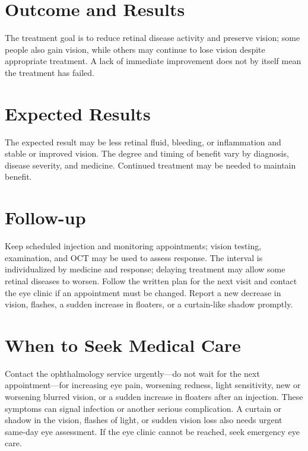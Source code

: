 \section*{Outcome and Results}
The treatment goal is to reduce retinal disease activity and preserve vision; some people also gain vision, while others may continue to lose vision despite appropriate treatment. A lack of immediate improvement does not by itself mean the treatment has failed.

\section*{Expected Results}
The expected result may be less retinal fluid, bleeding, or inflammation and stable or improved vision. The degree and timing of benefit vary by diagnosis, disease severity, and medicine. Continued treatment may be needed to maintain benefit.

\section*{Follow-up}
Keep scheduled injection and monitoring appointments; vision testing, examination, and OCT may be used to assess response. The interval is individualized by medicine and response; delaying treatment may allow some retinal diseases to worsen. Follow the written plan for the next visit and contact the eye clinic if an appointment must be changed. Report a new decrease in vision, flashes, a sudden increase in floaters, or a curtain-like shadow promptly.

\section*{When to Seek Medical Care}
Contact the ophthalmology service urgently—do not wait for the next appointment—for increasing eye pain, worsening redness, light sensitivity, new or worsening blurred vision, or a sudden increase in floaters after an injection. These symptoms can signal infection or another serious complication. A curtain or shadow in the vision, flashes of light, or sudden vision loss also needs urgent same-day eye assessment. If the eye clinic cannot be reached, seek emergency eye care.

